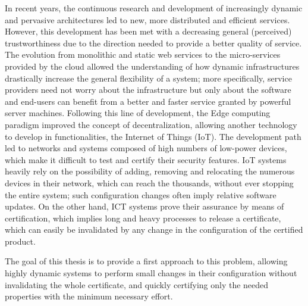 In recent years, the continuous research and development of increasingly dynamic and pervasive architectures led to new, more distributed and efficient services. However, this development has been met with a decreasing general (perceived) trustworthiness due to the direction needed to provide a better quality of service. The evolution from monolithic and static web services to the micro-services provided by the cloud allowed the understanding of how dynamic infrastructures drastically increase the general flexibility of a system; more specifically, service providers need not worry about the infrastructure but only about the software and end-users can benefit from a better and faster service granted by powerful server machines. Following this line of development, the Edge computing paradigm improved the concept of decentralization, allowing another technology to develop in functionalities, the Internet of Things (IoT). The development path led to networks and systems composed of high numbers of low-power devices, which make it difficult to test and certify their security features. IoT systems heavily rely on the possibility of adding, removing and relocating the numerous devices in their network, which can reach the thousands, without ever stopping the entire system; such configuration changes often imply relative software updates. On the other hand, ICT systems prove their assurance by means of certification, which implies long and heavy processes to release a certificate, which can easily be invalidated by any change in the configuration of the certified product.

The goal of this thesis is to provide a first approach to this problem, allowing highly dynamic systems to perform small changes in their configuration without invalidating the whole certificate, and quickly certifying only the needed properties with the minimum necessary effort.